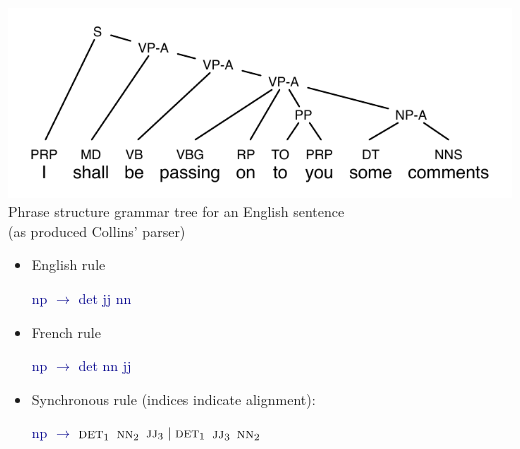 \documentclass[landscape]{slides}
\newcommand{\example}[1]{\textcolor{darkblue}{\rm #1}}
\begin{document}

\begin{center}
\includegraphics[width=25cm]{tree-psg.pdf}\\[5mm]
Phrase structure grammar tree for an English sentence\\ 
(as produced Collins' parser)
\end{center}


\begin{itemize} \vspace{10mm}
\item English rule
\begin{center}
\example{\sc np $\rightarrow$ det jj nn}
\end{center}
\item French rule
\begin{center}
\example{\sc np $\rightarrow$ det nn jj}
\end{center}
\item Synchronous rule (indices indicate alignment):
\begin{center}
\example{{\sc np} $\rightarrow$ $\text{\sc det}_1$ $\text{\sc nn}_2$ $\text{\sc jj}_3\;|\;\text{\sc det}_1$ $\text{\sc jj}_3$ $\text{\sc nn}_2$}
\end{center}
\end{itemize}

\end{document}
